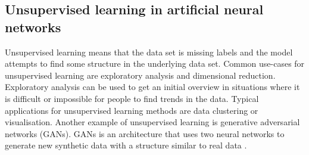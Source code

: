 \subsection{Unsupervised learning in artificial neural networks}
Unsupervised learning means that the data set is missing labels and the model attempts to find some structure in the underlying data set. Common use-cases for unsupervised learning are exploratory analysis and dimensional reduction. Exploratory analysis can be used to get an initial overview in situations where it is difficult or impossible for people to find trends in the data. Typical applications for unsupervised learning methods are data clustering or visualisation. Another example of unsupervised learning is generative adversarial networks (GANs). GANs is an architecture that uses two neural networks to generate new synthetic data with a structure similar to real data \cite{goodfellowGenerativeAdversarialNets2014}.


